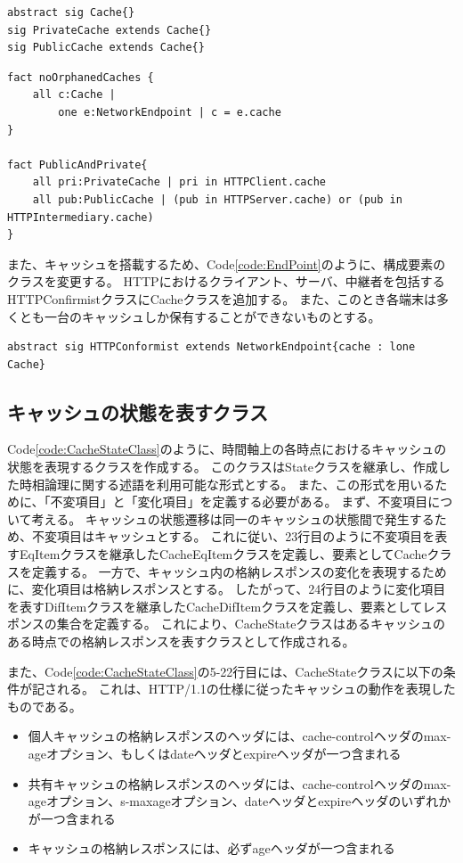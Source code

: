 \documentclass[12pt,a4paper]{jbook}
\begin{document}
\begin{lstlisting}[caption=Cacheクラス, label=code:CacheClass]
abstract sig Cache{}
sig PrivateCache extends Cache{}
sig PublicCache extends Cache{}
\end{lstlisting}

\begin{lstlisting}[caption=Cacheクラスの制限, label=code:LimitedCacheClass]
fact noOrphanedCaches {
	all c:Cache |
		one e:NetworkEndpoint | c = e.cache
}

fact PublicAndPrivate{
	all pri:PrivateCache | pri in HTTPClient.cache
	all pub:PublicCache | (pub in HTTPServer.cache) or (pub in HTTPIntermediary.cache)
}
\end{lstlisting}

また、キャッシュを搭載するため、Code\ref{code:EndPoint}のように、構成要素のクラスを変更する。
HTTPにおけるクライアント、サーバ、中継者を包括するHTTPConfirmistクラスにCacheクラスを追加する。
また、このとき各端末は多くとも一台のキャッシュしか保有することができないものとする。
\begin{lstlisting}[caption=HTTPを利用するウェブの構成要素, label=code:EndPoint]
abstract sig HTTPConformist extends NetworkEndpoint{cache : lone Cache}
\end{lstlisting}

\subsection{キャッシュの状態を表すクラス}
\label{sec:CacheClass}
Code\ref{code:CacheStateClass}のように、時間軸上の各時点におけるキャッシュの状態を表現するクラスを作成する。
このクラスはStateクラスを継承し、作成した時相論理に関する述語を利用可能な形式とする。
また、この形式を用いるために、「不変項目」と「変化項目」を定義する必要がある。
まず、不変項目について考える。
キャッシュの状態遷移は同一のキャッシュの状態間で発生するため、不変項目はキャッシュとする。
これに従い、23行目のように不変項目を表すEqItemクラスを継承したCacheEqItemクラスを定義し、要素としてCacheクラスを定義する。
一方で、キャッシュ内の格納レスポンスの変化を表現するために、変化項目は格納レスポンスとする。
したがって、24行目のように変化項目を表すDifItemクラスを継承したCacheDifItemクラスを定義し、要素としてレスポンスの集合を定義する。
これにより、CacheStateクラスはあるキャッシュのある時点での格納レスポンスを表すクラスとして作成される。

また、Code\ref{code:CacheStateClass}の5-22行目には、CacheStateクラスに以下の条件が記される。
これは、HTTP/1.1の仕様に従ったキャッシュの動作を表現したものである。
\begin{itemize}
\item 個人キャッシュの格納レスポンスのヘッダには、cache-controlヘッダのmax-ageオプション、もしくはdateヘッダとexpireヘッダが一つ含まれる
\item 共有キャッシュの格納レスポンスのヘッダには、cache-controlヘッダのmax-ageオプション、s-maxageオプション、dateヘッダとexpireヘッダのいずれかが一つ含まれる
\item キャッシュの格納レスポンスには、必ずageヘッダが一つ含まれる
\end{itemize}
\end{document}
